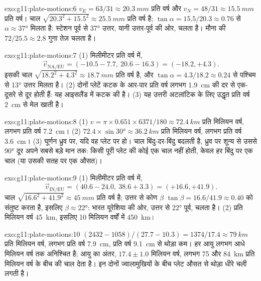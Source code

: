 \begin{solution}{exo:g11:plate-motions:6}
$v_E = 63/31 \approx \qty{20.3}{mm}$ प्रति वर्ष और $v_N = 48/31 \approx
\qty{15.5}{mm}$ प्रति वर्ष। चाल $\sqrt{20.3^2 + 15.5^2} \approx
\qty{25.5}{mm}$ प्रति वर्ष है; $\tan\alpha = 15.5/20.3 \approx 0.76$ से $\alpha
\approx \ang{37}$ मिलता है: स्टेशन पूर्व से \ang{37} उत्तर, यानी
उत्तर-पूर्व की ओर, चलता है। मौना की $72/25.5 \approx 2.8$ गुना तेज़ चलता है।
\end{solution}

\begin{solution}{exo:g11:plate-motions:7}
(1) मिलीमीटर प्रति वर्ष में,
\[
  \vec v_{\mathrm{NA/EU}} = (-10.5 - 7.7,\ 20.6 - 16.3) = (-18.2, +4.3).
\] इसकी चाल $\sqrt{18.2^2 + 4.3^2} \approx
\qty{18.7}{mm}$ प्रति वर्ष है, और $\tan\alpha = 4.3/18.2 \approx 0.24$ से
पश्चिम से \ang{13} उत्तर मिलता है। (2) दोनों प्लेटें कटक के आर-पार
प्रति वर्ष लगभग \qty{1.9}{cm} की दर से एक-दूसरे से दूर होती हैं: यह आइसलैंड में कटक की 
है। (3) यह उत्तरी अटलांटिक के लिए उद्धृत प्रति वर्ष \qty{2}{cm} से
मेल खाती है।
\end{solution}

\begin{solution}{exo:g11:plate-motions:8}
(1) $v = \pi \times 0.651 \times 6371/180 \approx \qty{72.4}{km}$ प्रति मिलियन
वर्ष, लगभग प्रति वर्ष \qty{7.2}{cm}। (2) $72.4 \times \sin\ang{30} \approx
\qty{36.2}{km}$ प्रति मिलियन वर्ष, लगभग प्रति वर्ष \qty{3.6}{cm}। (3) घूर्णन
ध्रुव पर, यदि वह प्लेट पर हो। चाल बिंदु-दर-बिंदु बदलती है,
ध्रुव पर शून्य से उससे \ang{90} दूर अपने सबसे बड़े मान तक: किसी
पूरी प्लेट की कोई एक चाल नहीं होती, केवल हर बिंदु पर एक चाल (या उसकी सतह पर
एक औसत)।
\end{solution}

\begin{solution}{exo:g11:plate-motions:9}
(1) मिलीमीटर प्रति वर्ष में,
\[
  \vec v_{\mathrm{IN/EU}} = (40.6 - 24.0,\ 38.6 + 3.3) = (+16.6, +41.9).
\] चाल $\sqrt{16.6^2 + 41.9^2} \approx
\qty{45}{mm}$ प्रति वर्ष है; उत्तर से कोण $\beta$ $\tan\beta =
16.6/41.9 \approx 0.40$ को संतुष्ट करता है, इसलिए $\beta \approx \ang{22}$: भारत
यूरेशिया की ओर, उत्तर से \ang{22} पूर्व, चलता है। (2) प्रति मिलियन वर्ष \qty{45}{km}, इसलिए
10 मिलियन वर्षों में \qty{450}{km}।
\end{solution}

\begin{solution}{exo:g11:plate-motions:10}
$(2432 - 1058)/(27.7 - 10.3) = 1374/17.4 \approx \qty{79}{km}$ प्रति मिलियन
वर्ष, लगभग प्रति वर्ष \qty{7.9}{cm}, प्रति वर्ष \qty{9.1}{cm} से थोड़ा कम।
हर आयु लगभग आधे मिलियन वर्ष तक अनिश्चित है; आयु का
अंतर, $17.4 \pm 1.0$ मिलियन वर्ष, लगभग 75 और
\qty{84}{km} प्रति मिलियन वर्ष के बीच की चाल देता है। इन दोनों ज्वालामुखियों के बीच प्लेट
औसत से थोड़ा धीरे चली लगती है।
\end{solution}

